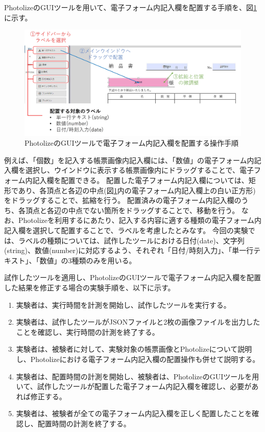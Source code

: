 PhotolizeのGUIツールを用いて、電子フォーム内記入欄を配置する手順を、図\ref{fig:photolize_how_to_use}に示す。
\begin{figure}[tp]
    \begin{center}
        \includegraphics[width=15cm]{image/06-discussion/photolize_how_to_use.jpg}
        \caption{PhotolizeのGUIツールで電子フォーム内記入欄を配置する操作手順}
        \label{fig:photolize_how_to_use}
    \end{center}
\end{figure}
例えば、「個数」を記入する帳票画像内記入欄には、「数値」の電子フォーム内記入欄を選択し、ウインドウに表示する帳票画像内にドラッグすることで、電子フォーム内記入欄を配置できる。
配置した電子フォーム内記入欄については、矩形であり、各頂点と各辺の中点(図\ref{fig:photolize_how_to_use}内の電子フォーム内記入欄上の白い正方形)をドラッグすることで、拡縮を行う。
配置済みの電子フォーム内記入欄のうち、各頂点と各辺の中点でない箇所をドラッグすることで、移動を行う。
なお、Photolizeを利用するにあたり、記入する内容に適する種類の電子フォーム内記入欄を選択して配置することで、ラベルを考慮したとみなす。
今回の実験では、ラベルの種類については、試作したツールにおける日付(date)、文字列(string)、数値(number)に対応するよう、それぞれ「日付/時刻入力」、「単一行テキスト」、「数値」の3種類のみを用いる。

試作したツールを適用し、PhotolizeのGUIツールで電子フォーム内記入欄を配置した結果を修正する場合の実験手順を、以下に示す。

\begin{enumerate}
    \item 実験者は、実行時間を計測を開始し、試作したツールを実行する。
    \item 実験者は、試作したツールがJSONファイルと2枚の画像ファイルを出力したことを確認し、実行時間の計測を終了する。
    \item 実験者は、被験者に対して、実験対象の帳票画像とPhotolizeについて説明し、Photolizeにおける電子フォーム内記入欄の配置操作も併せて説明する。
    \item 実験者は、配置時間の計測を開始し、被験者は、PhotolizeのGUIツールを用いて、試作したツールが配置した電子フォーム内記入欄を確認し、必要があれば修正する。
    \item 実験者は、被験者が全ての電子フォーム内記入欄を正しく配置したことを確認し、配置時間の計測を終了する。
\end{enumerate}

